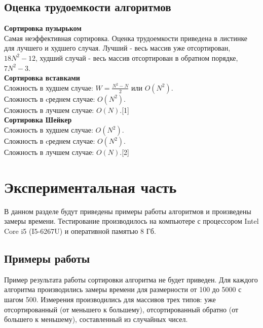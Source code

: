 \documentclass[12pt]{article}
\begin{document}
\subsection{Оценка трудоемкости алгоритмов}
\textbf{Сортировка пузырьком}\\
Самая неэффективная сортировка. Оценка трудоемкости приведена в листинке для лучшего и худшего случая. Лучший - весь массив уже отсортирован, $18N^{2}-12$, худший случай - весь массив отсортирован в обратном порядке, $7N^{2} - 3$. 
\\
\textbf{Сортировка вставками}\\
Сложность в худшем случае: $W = \frac{N^{2}-N}{2}$ или $O(N^{2})$.\\
Сложность в cреднем случае:  $O(N^{2})$.\\
Сложность в лучшем случае:  $O(N)$.[1]\\
\textbf{Сортировка Шейкер}\\
Сложность в худшем случае:  $O(N^{2})$.\\
Сложность в cреднем случае:  $O(N^{2})$.\\
Сложность в лучшем случае:  $O(N)$.[2]\\

\newpage
\section{Экспериментальная часть}
В данном разделе будут приведены примеры работы алгоритмов и произведены замеры времени. Тестирование производилось на компьютере с процессором Intel Core i5 (I5-6267U) и оперативной памятью 8 Гб. 
\subsection{Примеры работы}
Пример результата работы сортировки алгоритма не будет приведен. Для каждого алгоритма производились замеры времени для размерности от 100 до 5000 с шагом 500. Измерения производились для массивов трех типов: уже отсортированный (от меньшего к большему), отсортированный обратно (от большего к меньшему), составленный из случайных чисел. 
\newline
\end{document}
